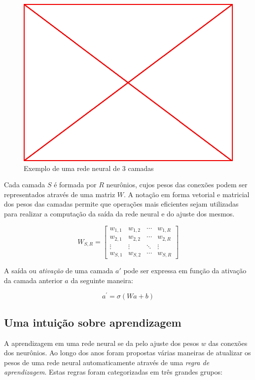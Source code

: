 \begin{figure}\label{fig:003-nn}
  \caption{Exemplo de uma rede neural de 3 camadas}
  \begin{center}
    \includegraphics[scale=0.5]{placeholder}
  \end{center}
\end{figure}

Cada camada $S$ é formada por $R$ neurônios, cujos pesos das conexões podem ser
representados através de uma matriz $W$. A notação em forma vetorial e
matricial dos pesos das camadas permite que operações mais eficientes sejam
utilizadas para realizar a computação da saída da rede neural e do ajuste dos
mesmos.

$$ W_{S,R} =
\begin{bmatrix}
  w_{1,1} & w_{1,2} & \cdots & w_{1,R} \\
  w_{2,1} & w_{2,2} & \cdots & w_{2,R} \\
  \vdots  & \vdots  & \ddots & \vdots  \\
  w_{S,1} & w_{S,2} & \cdots & w_{S,R}
\end{bmatrix}
$$

A saída ou \emph{ativação} de uma camada $a'$ pode ser expressa em função da
ativação da camada anterior $a$ da seguinte maneira:

$$a^{'} = \sigma(Wa+b)$$

\subsection{Uma intuição sobre aprendizagem}

A aprendizagem em uma rede neural se da pelo ajuste dos pesos $w$ das conexões
dos neurônios. Ao longo dos anos foram propostas várias maneiras de atualizar
os pesos de uma rede neural automaticamente através de uma \emph{regra de
  aprendizagem}. Estas regras foram categorizadas em três grandes grupos:

